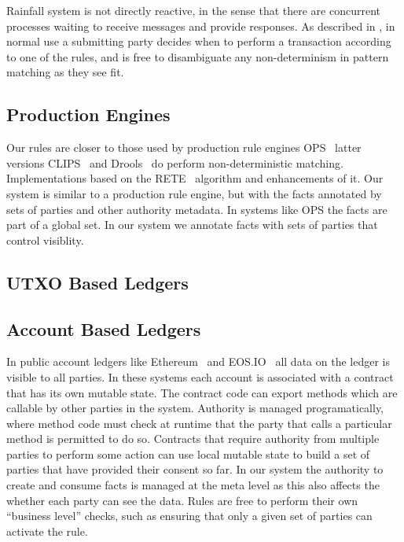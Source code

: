 Rainfall system is not directly reactive, in the sense that there are concurrent processes waiting to receive messages and provide responses. As described in \REF, in normal use a submitting party decides when to perform a transaction according to one of the rules, and is free to disambiguate any non-determinism in pattern matching as they see fit.


\subsection{Production Engines}
Our rules are closer to those used by production rule engines OPS~\cite{Forgy1981:OPS5} latter versions CLIPS~\cite{Riley2017:CLIPS} and Drools~\cite{Proctor2008:Drools} do perform non-deterministic matching. Implementations based on the RETE~\cite{Forgy1981:RETE} algorithm and enhancements \cite{Doorenbos1995:ProductionMatching} of it. Our system is similar to a production rule engine, but with the facts annotated by sets of parties and other authority metadata. In systems like OPS the facts are part of a global set. In our system we annotate facts with sets of parties that control visiblity.


\subsection{UTXO Based Ledgers}


\subsection{Account Based Ledgers}
In public account ledgers like Ethereum~\cite{Wood2014:Ethereum} and EOS.IO~\cite{Lee2018:EOSIO} all data on the ledger is visible to all parties. In these systems each account is associated with a contract that has its own mutable state. The contract code can export methods which are callable by other parties in the system. Authority is managed programatically, where method code must check at runtime that the party that calls a particular method is permitted to do so. Contracts that require authority from multiple parties to perform some action can use local mutable state to build a set of parties that have provided their consent so far. In our system the authority to create and consume facts is managed at the meta level as this also affects the whether each party can see the data. Rules are free to perform their own ``business level'' checks, such as ensuring that only a given set of parties can activate the rule.


